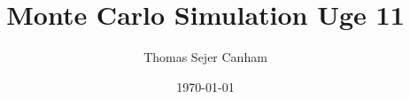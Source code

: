 \documentclass{article}
\title{Monte Carlo Simulation Uge 11}
\author{Thomas Sejer Canham}
\date{\today}
\theoremstyle{definition}
\theoremstyle{remark}
\begin{document}

\begin{titlepage}

    \maketitle
    \thispagestyle{empty}

\end{titlepage}
\end{document}

